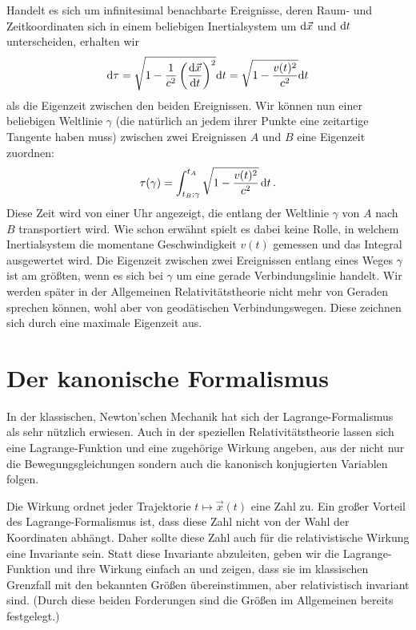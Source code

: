 Handelt es sich um
infinitesimal benachbarte Ereignisse,
deren Raum- und Zeitkoordinaten sich in einem
beliebigen Inertialsystem um
${\rm d}\vec{x}$ und ${\rm d}t$ unterscheiden,
erhalten wir
\begin{equation}
     {\rm d}\tau
      = \sqrt{ 1 - \frac{1}{c^2} \left(\frac{{\rm d}\vec{x}}{{\rm d}t} \right)^2} {\rm d}t
      = \sqrt{1 - \frac{v(t)^2}{c^2}} {\rm d}t
\end{equation}
als die Eigenzeit zwischen den beiden
Ereignissen. Wir k\"onnen nun einer beliebigen
Weltlinie $\gamma$ (die nat\"urlich an jedem ihrer Punkte
eine zeitartige Tangente haben muss) zwischen
zwei Ereignissen $A$ und $B$
eine Eigenzeit zuordnen:
\begin{equation}
     \tau(\gamma) = \int_{t_B;\gamma}^{t_A} \sqrt{1 - \frac{v(t)^2}{c^2}}
     \, {\rm d} t  \, .
\end{equation}
Diese Zeit wird von einer Uhr angezeigt, die entlang der
Weltlinie $\gamma$ von $A$ nach $B$ transportiert
wird. Wie schon erw\"ahnt spielt es dabei keine
Rolle, in welchem Inertialsystem die momentane
Geschwindigkeit $v(t)$ gemessen und das Integral
ausgewertet wird. Die Eigenzeit zwischen zwei
Ereignissen entlang eines Weges $\gamma$ ist
am gr\"o\ss ten, wenn es sich bei $\gamma$ um
eine gerade Verbindungslinie handelt. Wir werden
sp\"ater in der Allgemeinen Relativit\"atstheorie
nicht mehr von Geraden sprechen k\"onnen,
wohl aber von geod\"atischen Verbindungswegen.
Diese zeichnen sich durch eine maximale
Eigenzeit aus.  

\section{Der kanonische Formalismus}

In der klassischen, Newton'schen Mechanik hat sich
der Lagrange-Formalismus als sehr n\"utzlich erwiesen. Auch
in der speziellen Relativit\"atstheorie lassen sich
eine Lagrange-Funktion und eine zugeh\"orige Wirkung 
angeben, aus der nicht nur die Bewegungsgleichungen 
sondern auch die kanonisch konjugierten Variablen folgen.

Die Wirkung ordnet jeder Trajektorie $t \mapsto \vec{x}(t)$ 
eine Zahl zu. Ein gro\ss er Vorteil des Lagrange-Formalismus 
ist, dass diese Zahl nicht von der Wahl
der Koordinaten abh\"angt. Daher sollte diese Zahl auch
f\"ur die relativistische Wirkung eine Invariante sein. 
Statt diese Invariante abzuleiten, geben wir die
Lagrange-Funktion und ihre Wirkung einfach an und
zeigen, dass sie im klassischen Grenzfall mit den
bekannten Gr\"o\ss en \"ubereinstimmen, aber relativistisch
invariant sind. (Durch diese beiden Forderungen sind
die Gr\"o\ss en im Allgemeinen bereits festgelegt.)

